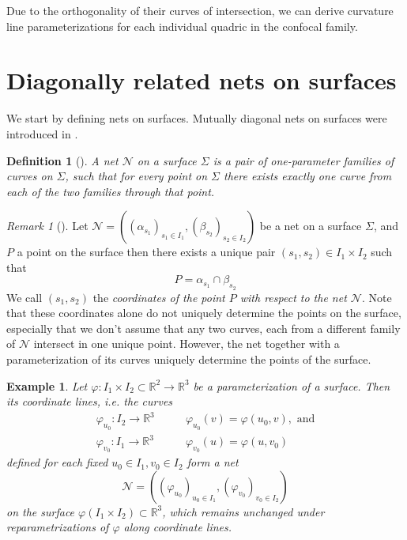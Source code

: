 \documentclass[10pt, a4paper]{article}
\theoremstyle{BoldTopSpacing}
\theoremstyle{BoldTopSpacing}
\theoremstyle{BoldTopSpacing}
\theoremstyle{BoldTopBottomSpacing}
\newtheorem{definition}{Definition}[section]
\theoremstyle{BoldTopSpacing}
\theoremstyle{BoldTopBottomSpacing}
\newtheorem{example}{Example}[section]
\theoremstyle{remark}
\newtheorem{remark}{\textit{Remark}}[section]
\begin{document}
Due to the orthogonality of their curves of intersection, we can derive curvature line parameterizations for each individual quadric in the confocal family.

\pagebreak
\section{Diagonally related nets on surfaces}
\label{sec:diagonally-related-nets}

We start by defining nets on surfaces. Mutually diagonal nets on surfaces were introduced in \cite{MutuallyDiagonalNets2019}.

\begin{definition}[]
\label{def:nets-on-surfaces}
A net $\mathcal{N}$ on a surface $\Sigma$ is a pair of one-parameter families of curves on $\Sigma$, such that for every point on $\Sigma$ there exists exactly one curve from each of the two families through that point.
\end{definition}

\begin{remark}[]
\label{rm:label}
Let $\mathcal{N} = \left( (\alpha_{s_{1}})_{s_{1} \in I_1}, (\beta_{s_{2}})_{s_{2} \in I_2} \right)$ be a net on a surface
$\Sigma$, and $P$ a point on the surface then there exists a unique pair $(s_{1}, s_{2}) \in I_{1}\times I_{2}$ such that
\[
    P = \alpha_{s_1} \cap \beta_{s_2}
\]
We call $(s_1, s_2)$ the \textit{coordinates of the point $P$ with respect to the net $\mathcal{N}$}. Note that these coordinates alone do not uniquely determine the points on the surface, especially that we don't assume that any two curves, each from a different family of $\mathcal{N}$ intersect in one unique point. However, the net together with a parameterization of its curves uniquely determine the points of the surface.
\end{remark}

\begin{example}
\label{ex:coordinate-lines-form-net-on-surfaces}
Let $\varphi : I_{1} \times I_{2} \subset \mathbb{R}^2 \to \mathbb{R}^3$ be a parameterization of a surface. Then its
coordinate lines, i.e. the curves
\begin{align*}
    \varphi_{u_0} : I_{2} \to \mathbb{R}^3 &\quad \quad \varphi_{u_0}(v) = \varphi(u_0, v), \text{ and} \\
    \varphi_{v_0} : I_{1} \to \mathbb{R}^3 &\quad \quad \varphi_{v_0}(u) = \varphi(u, v_0)
\end{align*}
defined for each fixed $u_{0} \in I_1, v_{0} \in I_2$ form a net
\[
    \mathcal{N} = \left( (\varphi_{u_0})_{u_{0} \in I_1}, (\varphi_{v_0})_{v_{0} \in I_2} \right)
\]
on the surface $\varphi\left( I_1 \times I_{2} \right) \subset \mathbb{R}^3$, which remains unchanged under reparametrizations of $\varphi$ along coordinate lines.
\end{example}
\end{document}
